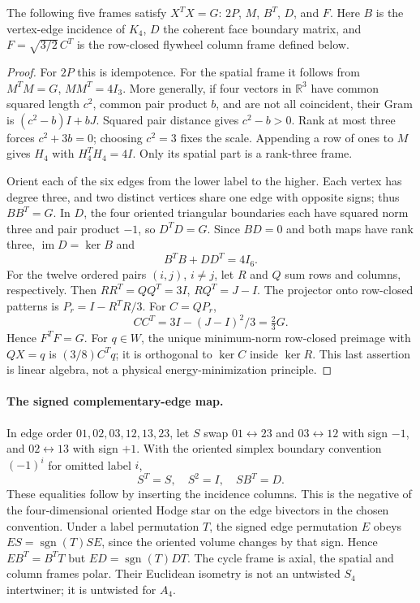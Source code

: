\begin{theorem}\label{thm:gram}
The following five frames satisfy $X^TX=G$: $2P$, $M$, $B^T$, $D$, and $F$. Here $B$ is the vertex-edge incidence of $K_4$, $D$ the coherent face boundary matrix, and $F=\sqrt{3/2}\,C^T$ is the row-closed flywheel column frame defined below.
\end{theorem}
\begin{proof}
For $2P$ this is idempotence. For the spatial frame it follows from $M^TM=G$, $MM^T=4I_3$. More generally, if four vectors in $\mathbb R^3$ have common squared length $c^2$, common pair product $b$, and are not all coincident, their Gram is $(c^2-b)I+bJ$. Squared pair distance gives $c^2-b>0$. Rank at most three forces $c^2+3b=0$; choosing $c^2=3$ fixes the scale. Appending a row of ones to $M$ gives $H_4$ with $H_4^TH_4=4I$. Only its spatial part is a rank-three frame.

Orient each of the six edges from the lower label to the higher. Each vertex has degree three, and two distinct vertices share one edge with opposite signs; thus $BB^T=G$. In $D$, the four oriented triangular boundaries each have squared norm three and pair product $-1$, so $D^TD=G$. Since $BD=0$ and both maps have rank three, $\operatorname{im}D=\ker B$ and
\begin{equation}
 B^TB+DD^T=4I_6.\label{eq:split}
\end{equation}
For the twelve ordered pairs $(i,j)$, $i\ne j$, let $R$ and $Q$ sum rows and columns, respectively. Then $RR^T=QQ^T=3I$, $RQ^T=J-I$. The projector onto row-closed patterns is $P_r=I-R^TR/3$. For $C=QP_r$,
\begin{equation}
 CC^T=3I-(J-I)^2/3=\tfrac23G.
\end{equation}
Hence $F^TF=G$. For $q\in W$, the unique minimum-norm row-closed preimage with $QX=q$ is $(3/8)C^Tq$; it is orthogonal to $\ker C$ inside $\ker R$. This last assertion is linear algebra, not a physical energy-minimization principle.
\end{proof}

\paragraph{The signed complementary-edge map.} In edge order $01,02,03,12,13,23$, let $S$ swap $01\leftrightarrow23$ and $03\leftrightarrow12$ with sign $-1$, and $02\leftrightarrow13$ with sign $+1$. With the oriented simplex boundary convention $(-1)^i$ for omitted label $i$,
\begin{equation}
 S^T=S,\quad S^2=I,\quad SB^T=D.\label{eq:star}
\end{equation}
These equalities follow by inserting the incidence columns. This is the negative of the four-dimensional oriented Hodge star on the edge bivectors in the chosen convention. Under a label permutation $T$, the signed edge permutation $E$ obeys $ES=\operatorname{sgn}(T)SE$, since the oriented volume changes by that sign. Hence $EB^T=B^TT$ but $ED=\operatorname{sgn}(T)DT$. The cycle frame is axial, the spatial and column frames polar. Their Euclidean isometry is not an untwisted $S_4$ intertwiner; it is untwisted for $A_4$.

